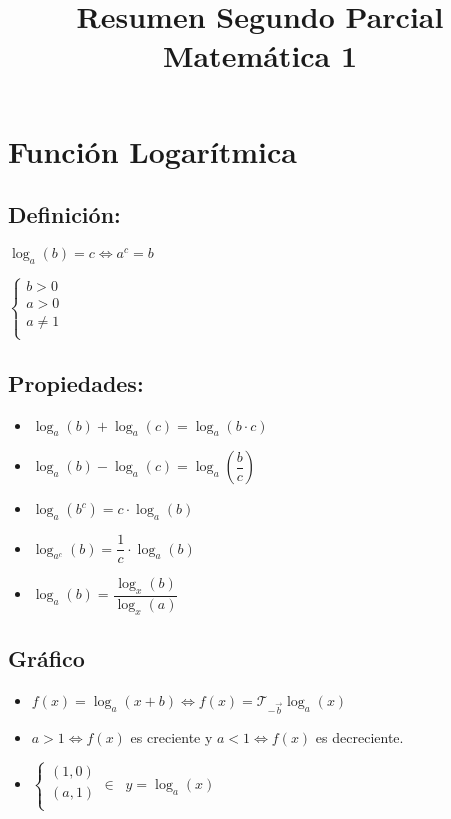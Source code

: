 \documentclass{article}
\title{Resumen Segundo Parcial Matemática 1}
\date{\vspace{-5ex}}
\begin{document}
\maketitle

\section*{Función Logarítmica}

\subsection*{Definición:}

$\log_a(b) = c \Longleftrightarrow a^c = b$

$\begin{cases}
    b > 0 \\
    a > 0 \\
    a \neq 1 \\
\end{cases}$

\subsection*{Propiedades:}

\begin{itemize}
\item $\log_a(b) + \log_a(c) = \log_a(b\cdot c)$
\item $\log_a(b) - \log_a(c) = \log_a\left( \dfrac{b}{c} \right)$
\item $\log_a(b^c) = c \cdot \log_a(b)$
\item $\log_{a^c}(b) = \dfrac{1}{c}\cdot \log_a(b)$
\item $\log_a(b) = \dfrac{\log_x(b)}{\log_x(a)}$
\end{itemize}

\subsection*{Gráfico}

\begin{itemize}
\item $f(x) = \log_a(x+b) \Longleftrightarrow f(x) = \mathscr{T}_{-\vec{b}} \log_a(x)$

\item $a > 1 \Longleftrightarrow f(x)$ es creciente y $a < 1 \Longleftrightarrow f(x)$ es decreciente.

\item $\begin{cases}
    (1,0) \\
    (a,1) \\
\end{cases} \in \; \; y = \log_a(x)$

\end{itemize}
\end{document}
